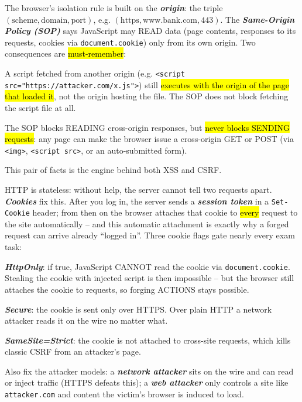 \documentclass[12pt, a4paper]{article}
\newcommand{\term}[1]{\textbf{\textit{#1}}}        %
\newcommand{\imp}[1]{\hl{#1}}                       %
\begin{document}
The browser's isolation rule is built on the \term{origin}: the triple $(\text{scheme}, \text{domain}, \text{port})$, e.g. $(\text{https}, \text{www.bank.com}, 443)$. The \term{Same-Origin Policy (SOP)} says JavaScript may READ data (page contents, responses to its requests, cookies via \texttt{document.cookie}) only from its own origin. Two consequences are \imp{must-remember}:\begin{tightitem}\item A script fetched from another origin (e.g. \texttt{<script src="https://attacker.com/x.js">}) still \imp{executes with the origin of the page that loaded it}, not the origin hosting the file. The SOP does not block fetching the script file at all.\item The SOP blocks READING cross-origin responses, but \imp{never blocks SENDING requests}: any page can make the browser issue a cross-origin GET or POST (via \texttt{<img>}, \texttt{<script src>}, or an auto-submitted form).\end{tightitem}This pair of facts is the engine behind both XSS and CSRF.

HTTP is stateless: without help, the server cannot tell two requests apart. \term{Cookies} fix this. After you log in, the server sends a \term{session token} in a \texttt{Set-Cookie} header; from then on the browser attaches that cookie to \imp{every} request to the site automatically -- and this automatic attachment is exactly why a forged request can arrive already ``logged in''. Three cookie flags gate nearly every exam task:\begin{tightitem}\item \term{HttpOnly}: if true, JavaScript CANNOT read the cookie via \texttt{document.cookie}. Stealing the cookie with injected script is then impossible -- but the browser still attaches the cookie to requests, so forging ACTIONS stays possible.\item \term{Secure}: the cookie is sent only over HTTPS. Over plain HTTP a network attacker reads it on the wire no matter what.\item \term{SameSite=Strict}: the cookie is not attached to cross-site requests, which kills classic CSRF from an attacker's page.\end{tightitem}Also fix the attacker models: a \term{network attacker} sits on the wire and can read or inject traffic (HTTPS defeats this); a \term{web attacker} only controls a site like \texttt{attacker.com} and content the victim's browser is induced to load.
\end{document}

